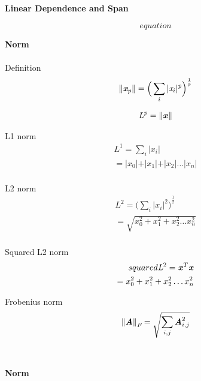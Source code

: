 \documentclass[12pt]{minimal}
\begin{document}
\textbf{Linear Dependence and Span} 

\begin{equation}
    equation
\end{equation}


\textbf{Norm} \\ \\

Definition \\
\begin{equation}
    \Vert \textit{\textbf{x}}_{\textit{p}} \Vert = {\Big(\sum_{i}\vert\textit{x}_{i}\vert^{\textit{p}}\Big)}^{\frac{1}{\textit{p}}}
\end{equation}

\begin{equation}
    \begin{split}
        \textit{L}^{\textit{p}} = \Vert \textbf{\textit{x}} \Vert  \\
    \end{split}
\end{equation}


L1 norm \\ 
\begin{equation}
    \begin{split}
        L^1 = \sum_{i}\vert\textit{x}_{i}\vert \\ 
        = \vert x_0 \vert + \vert x_1\vert + \vert x_2\vert \dots \vert x_n \vert \\
    \end{split}
\end{equation}


L2 norm \\
\begin{equation}
    \begin{split}
        L^2 = {\Big(\sum_{i}\vert\textit{x}_{i}\vert^{2}\Big)}^{\frac{1}{2}} \\ 
        = \sqrt{x_0^2 + x_1^2 + x_2^2 \dots x_n^2} \\ 
    \end{split}
\end{equation}


Squared L2 norm \\ 
\begin{equation}
    \begin{split}
        squared \textit{L}^2 = \textbf{\textit{x}}^{T}\textbf{\textit{x}} \\ 
        = x_0^2 + x_1^2 + x_2^2 \dots x_n^2 \\ 
    \end{split}
\end{equation}

Frobenius norm \\
\begin{equation}
    \begin{split}
        {\Vert\textbf{\textit{A}}\Vert}_{\textit{F}} = \sqrt{\sum_{i,j}\textit{\textbf{A}}_{i,j}^{2}} \\ 
    \end{split}
\end{equation} \\ \\


\textbf{Norm} \\ \\
\end{document}
